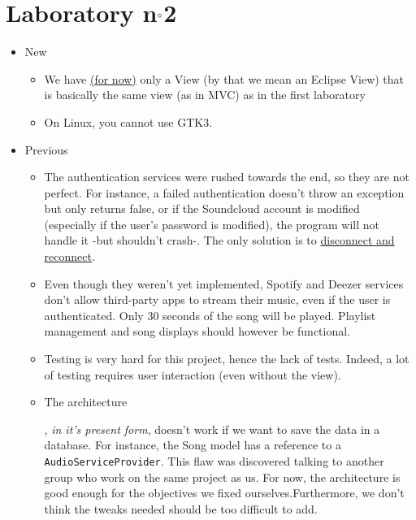 \documentclass{report}
\begin{document}
\section{Laboratory n$\degree$2}

\begin{itemize}
\item New
\begin{itemize}
\item We have \hyperref[lim::toolbar]{(for now)} only a View (by that we mean an Eclipse View) that is basically the same view (as in MVC) as in the first laboratory
\item On Linux, you cannot use GTK3.
\end{itemize}
\item Previous
\begin{itemize}

\item The authentication services were rushed towards the end, so they are not perfect. For instance, a failed authentication doesn't throw an exception but only returns false, or if the Soundcloud account is modified (especially if the user's password is modified), the program will not handle it -but shouldn't crash-. The only solution is to \href{http://img.pandawhale.com/post-16780-have-you-tried-forcing-an-unex-uQSY.gif}{disconnect and reconnect}. 
\item Even though they weren't yet implemented, Spotify and Deezer services don't allow third-party apps to stream their music, even if the user is authenticated. Only 30 seconds of the song will be played. Playlist management and song displays should however be functional.
\item Testing is very hard for this project, hence the lack of tests. Indeed, a lot of testing requires user interaction (even without the view).
\item \hypertarget{db}{The architecture}, \textit{in it's present form}, doesn't work if we want to save the data in a database. For instance, the Song model has a reference to a \texttt{AudioServiceProvider}. This flaw was discovered talking to another group who work on the same project as us. For now, the architecture is good enough for the objectives we fixed ourselves.Furthermore, we don't think the tweaks needed should be too difficult to add.
\end{itemize}
\end{itemize}


\end{document}
